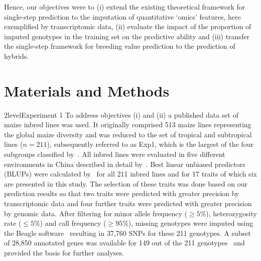 \documentclass[12pt,titlepage]{article}
\begin{document}
Hence, our objectives were to (i) extend the existing theoretical framework for
single-step prediction to the imputation of quantitative `omics' features, here
exemplified by transcriptomic data, (ii) evaluate the impact of the proportion of
imputed genotypes in the training set on the predictive ability and (iii) transfer
the single-step framework for breeding value prediction to the prediction of
hybrids.






\section{Materials and Methods}
\Genetics2level{Experiment 1}
To address objectives (i) and (ii) a published data set of maize inbred lines
\cite{Yang2014} was used.
It originally comprised 513 maize lines representing the global maize
diversity  and was reduced to the set of tropical and subtropical lines
($n = 211$), subsequently referred to as Exp1, which is the largest of the four
subgroups classified by~.
All inbred lines were evaluated in five different environments in China
described in detail by~.
Best linear unbiased predictors (BLUPs) were calculated by~ for
all 211 inbred lines and for 17 traits of which six are presented in this study.
The selection of these traits was done based on our prediction results so that
two traits were predicted with greater precision by transcriptomic data and four
further traits were predicted with greater precision by genomic data.
After filtering for minor allele frequency ($\geq 5$\%), heterozygosity rate
($\leq 5$\%) and call frequency ($\geq 95$\%), missing genotypes were imputed
using the Beagle software~\cite{Browning2009} resulting in 37,760 SNPs for these
211 genotypes.
A subset of 28,850 annotated genes was available for 149 out of the 211
genotypes~\cite{Fu2013} and provided the basis for further analyses.
\end{document}
